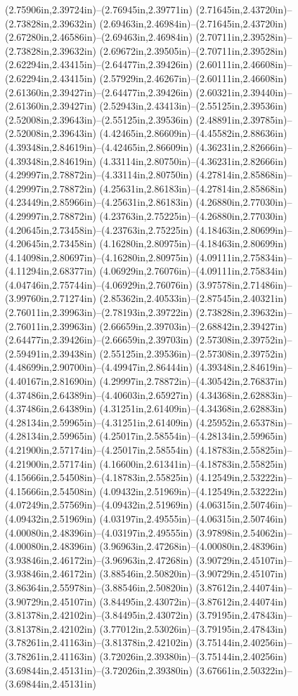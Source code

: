 (2.75906in,2.39724in)--(2.76945in,2.39771in) (2.71645in,2.43720in)--(2.73828in,2.39632in) (2.69463in,2.46984in)--(2.71645in,2.43720in) (2.67280in,2.46586in)--(2.69463in,2.46984in) (2.70711in,2.39528in)--(2.73828in,2.39632in) (2.69672in,2.39505in)--(2.70711in,2.39528in) (2.62294in,2.43415in)--(2.64477in,2.39426in) (2.60111in,2.46608in)--(2.62294in,2.43415in) (2.57929in,2.46267in)--(2.60111in,2.46608in) (2.61360in,2.39427in)--(2.64477in,2.39426in) (2.60321in,2.39440in)--(2.61360in,2.39427in) (2.52943in,2.43413in)--(2.55125in,2.39536in) (2.52008in,2.39643in)--(2.55125in,2.39536in) (2.48891in,2.39785in)--(2.52008in,2.39643in) (4.42465in,2.86609in)--(4.45582in,2.88636in) (4.39348in,2.84619in)--(4.42465in,2.86609in) (4.36231in,2.82666in)--(4.39348in,2.84619in) (4.33114in,2.80750in)--(4.36231in,2.82666in) (4.29997in,2.78872in)--(4.33114in,2.80750in) (4.27814in,2.85868in)--(4.29997in,2.78872in) (4.25631in,2.86183in)--(4.27814in,2.85868in) (4.23449in,2.85966in)--(4.25631in,2.86183in) (4.26880in,2.77030in)--(4.29997in,2.78872in) (4.23763in,2.75225in)--(4.26880in,2.77030in) (4.20645in,2.73458in)--(4.23763in,2.75225in) (4.18463in,2.80699in)--(4.20645in,2.73458in) (4.16280in,2.80975in)--(4.18463in,2.80699in) (4.14098in,2.80697in)--(4.16280in,2.80975in) (4.09111in,2.75834in)--(4.11294in,2.68377in) (4.06929in,2.76076in)--(4.09111in,2.75834in) (4.04746in,2.75744in)--(4.06929in,2.76076in) (3.97578in,2.71486in)--(3.99760in,2.71274in) (2.85362in,2.40533in)--(2.87545in,2.40321in) (2.76011in,2.39963in)--(2.78193in,2.39722in) (2.73828in,2.39632in)--(2.76011in,2.39963in) (2.66659in,2.39703in)--(2.68842in,2.39427in) (2.64477in,2.39426in)--(2.66659in,2.39703in) (2.57308in,2.39752in)--(2.59491in,2.39438in) (2.55125in,2.39536in)--(2.57308in,2.39752in) (4.48699in,2.90700in)--(4.49947in,2.86444in) (4.39348in,2.84619in)--(4.40167in,2.81690in) (4.29997in,2.78872in)--(4.30542in,2.76837in) (4.37486in,2.64389in)--(4.40603in,2.65927in) (4.34368in,2.62883in)--(4.37486in,2.64389in) (4.31251in,2.61409in)--(4.34368in,2.62883in) (4.28134in,2.59965in)--(4.31251in,2.61409in) (4.25952in,2.65378in)--(4.28134in,2.59965in) (4.25017in,2.58554in)--(4.28134in,2.59965in) (4.21900in,2.57174in)--(4.25017in,2.58554in) (4.18783in,2.55825in)--(4.21900in,2.57174in) (4.16600in,2.61341in)--(4.18783in,2.55825in) (4.15666in,2.54508in)--(4.18783in,2.55825in) (4.12549in,2.53222in)--(4.15666in,2.54508in) (4.09432in,2.51969in)--(4.12549in,2.53222in) (4.07249in,2.57569in)--(4.09432in,2.51969in) (4.06315in,2.50746in)--(4.09432in,2.51969in) (4.03197in,2.49555in)--(4.06315in,2.50746in) (4.00080in,2.48396in)--(4.03197in,2.49555in) (3.97898in,2.54062in)--(4.00080in,2.48396in) (3.96963in,2.47268in)--(4.00080in,2.48396in) (3.93846in,2.46172in)--(3.96963in,2.47268in) (3.90729in,2.45107in)--(3.93846in,2.46172in) (3.88546in,2.50820in)--(3.90729in,2.45107in) (3.86364in,2.55978in)--(3.88546in,2.50820in) (3.87612in,2.44074in)--(3.90729in,2.45107in) (3.84495in,2.43072in)--(3.87612in,2.44074in) (3.81378in,2.42102in)--(3.84495in,2.43072in) (3.79195in,2.47843in)--(3.81378in,2.42102in) (3.77012in,2.53026in)--(3.79195in,2.47843in) (3.78261in,2.41163in)--(3.81378in,2.42102in) (3.75144in,2.40256in)--(3.78261in,2.41163in) (3.72026in,2.39380in)--(3.75144in,2.40256in) (3.69844in,2.45131in)--(3.72026in,2.39380in) (3.67661in,2.50322in)--(3.69844in,2.45131in) 